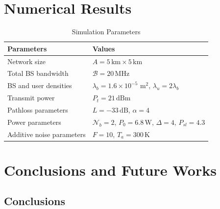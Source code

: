 \documentclass[12pt]{report}
\begin{document}


\lipsum[2-4]









\chapter{Numerical Results}



\begin{table}[H]
\caption{Simulation Parameters} %
\centering %
    \begin{tabular}{| l | l |}
	 \hline\hline
    Parameters & Values \\ \hline
    Network size &  $A = 5\,\text{km}\times 5\,\text{km}$ \\ \hline
    Total BS bandwidth &  $\mathcal{B}=20\,\text{MHz}$ \\ \hline
		BS and user densities &  $\lambda_b = 1.6\times 10^{-5}\,\,\text{m}^2$, $\lambda_u = 2\lambda_b$  \\ \hline
    Transmit power &  $P_t = 21\, \text{dBm}$ \\ \hline
    Pathloss parameters & $L = -33\,\text{dB}$, $\alpha=4$ \\ \hline
    Power parameters & $\mathcal{N}_b = 2$, $P_0=6.8\,\text{W}$, $\Delta=4$, $P_{sl}=4.3$ \\\hline	
    Additive noise parameters & $F = 10$, $T_a = 300\,\text{K}$\\\hline		
\end{tabular}
\end{table}



\lipsum[2-4]



\chapter{Conclusions and Future Works}

\section{Conclusions}
\end{document}
